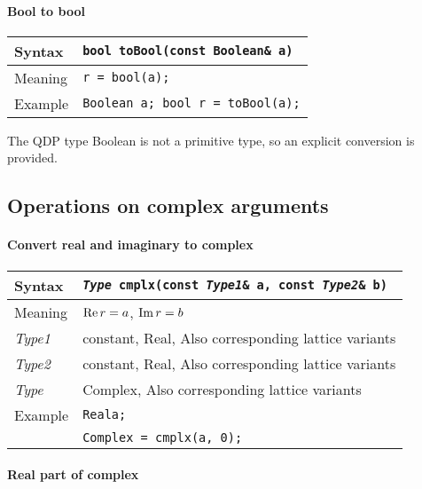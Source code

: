 \documentclass[12pt,letterpaper]{article}
\renewcommand{\Re}{\mathop{\rm Re}}
\renewcommand{\Im}{\mathop{\rm Im}}
\newcommand{\tConstant}{constant}
\newcommand{\tReal}{Real}
\newcommand{\tComplex}{Complex}
\newcommand{\tBoolean}{Boolean}
\newcommand{\simLatticeVariants}{Also corresponding lattice variants}
\newcommand{\protoBinaryQual}[1]{{\tt {\it Type} #1(const {\it Type1}\& a, const {\it Type2}\& b)}}
\begin{document}
\paragraph{Bool to bool} 

\begin{flushleft}
  \begin{tabular}{|l|l|}
  \hline
  Syntax      & {\tt bool toBool(const \tBoolean\& a)} \\
  \hline
  Meaning     & \verb|r = bool(a);|\\
  \hline
  Example     & {\tt \tBoolean{} a; bool r = toBool(a);} \\
  \hline
  \end{tabular}
\end{flushleft}

The QDP type \tBoolean{} is not a primitive type, so an explicit conversion is provided.

\subsection{Operations on complex arguments}

\paragraph{Convert real and imaginary to complex}

\begin{flushleft}
  \begin{tabular}{|l|l|}
  \hline
  Syntax      & \protoBinaryQual{cmplx} \\
  \hline
  Meaning     & $\Re r = a$, $\Im r = b$ \\
  \hline
  {\it Type1} & \tConstant, \tReal, \simLatticeVariants\\
  {\it Type2} & \tConstant, \tReal, \simLatticeVariants\\
  \hline
  {\it Type}  & \tComplex, \simLatticeVariants\\
  \hline
  Example     & {\tt \tReal a;}\\
              & {\tt \tComplex{} = cmplx(a, 0);}\\
  \hline
  \end{tabular}
\end{flushleft}

\paragraph{Real part of complex}
\end{document}
